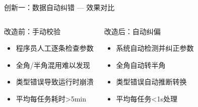 \documentclass[aspectratio=169,UTF8,xcolor=table]{ctexbeamer}
\begin{document}
\begin{frame}{创新一：数据自动纠错 — 效果对比}
  \begin{columns}[T]
    \begin{block}{改造前：手动校验}
      \begin{itemize}
        \item 程序员人工逐条检查参数
        \item 全角/半角混用难以发现
        \item 类型错误导致运行时崩溃
        \item 平均每任务耗时>5min
      \end{itemize}
    \end{block}

    \begin{exampleblock}{改造后：自动纠偏}
      \begin{itemize}
        \item 系统自动检测并纠正参数
        \item 全角自动转半角
        \item 类型错误自动推断转换
        \item 平均每任务<1s处理
      \end{itemize}
    \end{exampleblock}
  \end{columns}

  \vspace{0.3cm}
  \begin{center}
  \end{center}
\end{frame}
\end{document}
